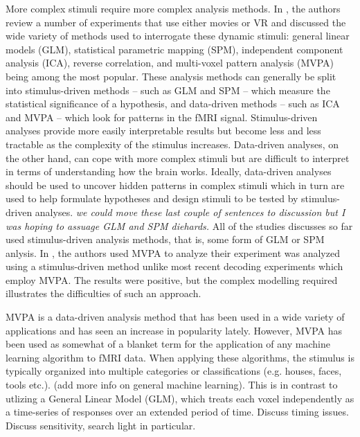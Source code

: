 \documentclass[preprint,5p,authoryear]{elsarticle}
\begin{document}
More complex stimuli require more complex analysis methods.
In \cite{Spiers2007}, the authors review a number of experiments that use either movies or VR and discussed the wide variety of methods used to interrogate these dynamic stimuli: general linear models (GLM), statistical parametric mapping (SPM), independent component analysis (ICA), reverse correlation, and multi-voxel pattern analysis (MVPA) being among the most popular.
These analysis methods can generally be split into stimulus-driven methods -- such as GLM and SPM -- which measure the statistical significance of a hypothesis, and data-driven methods -- such as ICA and MVPA -- which look for patterns in the fMRI signal.
Stimulus-driven analyses provide more easily interpretable results but become less and less tractable as the complexity of the stimulus increases.
Data-driven analyses, on the other hand, can cope with more complex stimuli but are difficult to interpret in terms of understanding how the brain works.
Ideally, data-driven analyses should be used to uncover hidden patterns in complex stimuli which in turn are used to help formulate hypotheses and design stimuli to be tested by stimulus-driven analyses.
\emph{we could move these last couple of sentences to discussion but I was hoping to assuage GLM and SPM diehards.}
\cite{Maguire1998}\cite{Calhoun2002}\cite{King2005}\cite{King2006}\cite{Mathiak2006}\cite{Spiers2007a}
All of the studies discusses so far used stimulus-driven analysis methods, that is, some form of GLM or SPM anlysis.
In \cite{Hassabis2009}\cite{Chadwick2010}, the authors used MVPA to analyze their experiment
\cite{Nishimoto2011} was analyzed using a stimulus-driven method unlike most recent decoding experiments which employ MVPA.
The results were positive, but the complex modelling required illustrates the difficulties of such an approach.

MVPA is a data-driven analysis method that has been used in a wide variety of applications \citep{Haxby2001,Mitchell2003,Haynes2006} and has seen an increase in popularity lately.
However, MVPA has been used as somewhat of a blanket term for the application of any machine learning algorithm to fMRI data.
When applying these algorithms, the stimulus is typically organized into multiple categories or classifications (e.g. houses, faces, tools etc.).
(add more info on general machine learning).
This is in contrast to utlizing a General Linear Model (GLM), which treats each voxel independently as a time-series of responses over an extended period of time.
Discuss timing issues.
Discuss sensitivity, search light in particular.
\end{document}
